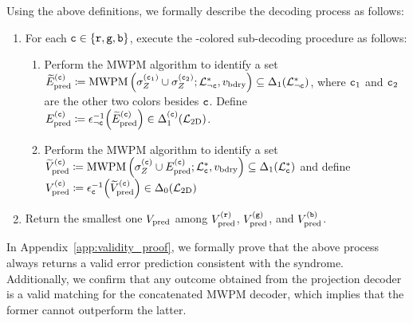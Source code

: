 \documentclass[a4paper,twocolumn,11pt,accepted=2025-01-21]{quantumarticle}
\theoremstyle{definition}
\theoremstyle{definition}
\theoremstyle{definition}
\begin{document}
Using the above definitions, we formally describe the decoding process as follows:
\begin{enumerate}
    \item For each $\cbs \in \qty{\rbs, \gbs, \bbs}$, execute the \cbs-colored sub-decoding procedure as follows:
    \begin{enumerate}
        \item Perform the MWPM algorithm to identify a set $\wtilde{E}_\mr{pred}^{(\cbs)} \coloneqq \MWPM{\LatticeRest{\cbs}}{v_\mr{bdry}}{\sigma_Z^{(\cbs_1)} \cup \sigma_Z^{(\cbs_2)}} \subseteq \latelm{\LatticeRest{\cbs}}{1}$, where $\cbs_1$ and $\cbs_2$ are the other two colors besides $\cbs$.
        Define $E_\mr{pred}^{(\cbs)} \coloneqq \EdgeCorrRest{\cbs}^{-1} \qty(\wtilde{E}_\mr{pred}^{(\cbs)}) \in \latelmcolor{\LatticeTwoD}{1}{\cbs}$.
        \item Perform the MWPM algorithm to identify a set $\wtilde{V}_\mr{pred}^{(\cbs)} \coloneqq \MWPM{\LatticeMono{\cbs}}{v_\mr{bdry}}{\sigma_Z^{(\cbs)} \cup E_\mr{pred}^{(\cbs)}} \subseteq \latelm{\LatticeMono{\cbs}}{1}$ and define $V_\mr{pred}^{(\cbs)} \coloneqq \EdgeCorrMono{\cbs}^{-1} \qty(\wtilde{V}_\mr{pred}^{(\cbs)}) \in \latelm{\LatticeTwoD}{0}$
    \end{enumerate}
     \item Return the smallest one $V_\mr{pred}$ among $V_\mr{pred}^{(\rbs)}$, $V_\mr{pred}^{(\gbs)}$, and $V_\mr{pred}^{(\bbs)}$.
\end{enumerate}

In Appendix~\ref{app:validity_proof}, we formally prove that the above process always returns a valid error prediction consistent with the syndrome.
Additionally, we confirm that any outcome obtained from the projection decoder is a valid matching for the concatenated MWPM decoder, which implies that the former cannot outperform the latter.
\end{document}
